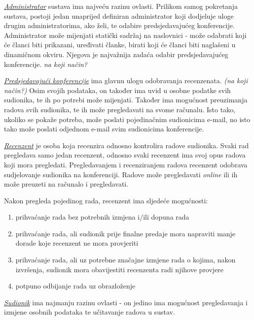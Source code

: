 		\underline{\textit{Administrator}} sustava ima najveću razinu ovlasti. Prilikom samog pokretanja sustava, postoji jedan unaprijed definiran administrator koji dodjeluje uloge drugim administratorima, ako želi, te odabire predsjedavajućeg konferencije. Administrator može mijenjati statički sadržaj na naslovnici - može odabrati koji će članci biti prikazani, uređivati članke, birati koji će članci biti naglašeni u dinamičnom okviru. Njegova je najvažnija zadaća odabir predsjedavajućeg konferencije. \textit{na koji način?}
		
		
		\underline{\textit{Predsjedavajući konferencije}} ima glavnu ulogu odobravanja recenzenata. \textit{(na koji način?)} Osim svojih podataka, on također ima uvid u osobne podatke svih sudionika, te ih po potrebi može mijenjati. Također ima mogućnost preuzimanja radova svih sudionika, te ih može pregledavati na svome računalu. Isto tako, ukoliko se pokaže potreba, može poslati pojedinačnim sudionicima e-mail, no isto tako može poslati odjednom e-mail svim sudionicima konferencije. 
		
		
		\underline{\textit{Recenzent}} je osoba koja recenzira odnosno kontrolira radove sudionika. Svaki rad pregledava samo jedan recenzent, odnosno svaki recenzent ima svoj opus radova koji mora pregledati. Pregledavanjem i recenziranjem radova recenzent odobrava sudjelovanje sudionika na konferenciji. Radove može pregledavati \textit{online} ili ih može preuzeti na računalo i pregledavati. 
		
		Nakon pregleda pojedinog rada, recenzent ima sljedeće mogućnosti:
		
		\begin{enumerate}
			
			\item prihvaćanje rada bez potrebnih izmjena i/ili dopuna rada
			\item prihvaćanje rada, ali sudionik prije finalne predaje mora napraviti manje dorade koje recenzent ne mora provjeriti
			\item prihvaćanje rada, ali uz potrebne značajne izmjene rada o kojima, nakon izvršenja, sudionik mora obavijestiti recenzenta radi njihove provjere
			\item potpuno odbijanje rada uz obrazloženje
			
		\end{enumerate}
	
		\underline{\textit{Sudionik}} ima najmanju razinu ovlasti - on jedino ima mogućnost pregledavanja i izmjene osobnih podataka te učitavanje radova u sustav. 
	
		\eject
		
	